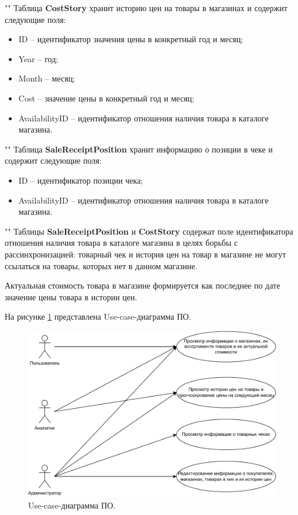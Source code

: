 \documentclass[a4paper,14pt]{extreport}
\begin{document}
""\newline\indent
Таблица \textbf{CostStory} хранит историю цен на товары в магазинах и содержит следующие поля:
\begin{itemize}
	\setlength\itemsep{0.01em}
	\item ID -- идентификатор значения цены в конкретный год и месяц;
	\item Year -- год;
	\item Month -- месяц;
	\item Cost -- значение цены в конкретный год и месяц;
	\item AvailabilityID -- идентификатор отношения наличия товара в каталоге магазина.
\end{itemize}

""\newline\indent
Таблица \textbf{SaleReceiptPosition} хранит информацию о позиции в чеке и содержит следующие поля:
\begin{itemize}
	\setlength\itemsep{0.01em}
	\item ID -- идентификатор позиции чека;
	\item AvailabilityID -- идентификатор отношения наличия товара в каталоге магазина.
\end{itemize}

""\newline\indent
Таблицы \textbf{SaleReceiptPosition} и \textbf{CostStory} содержат поле идентификатора отношения наличия товара в каталоге магазина в целях борьбы с рассинхронизацией: товарный чек и история цен на товар в магазине не могут ссылаться на товары, которых нет в данном магазине.

Актуальная стоимость товара в магазине формируется как последнее по дате значение цены товара в истории цен.

На рисунке \ref{use_case} представлена Use-case-диаграмма ПО.

\begin{figure}[H]
	\centering
	\includegraphics[scale=0.8]{use_case.drawio.pdf}
	\caption{Use-case-диаграмма ПО.}
	\label{use_case}
\end{figure}
\end{document}
